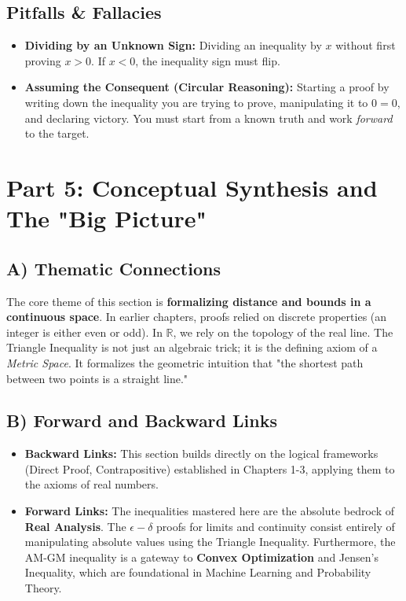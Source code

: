 \documentclass[11pt]{article}
\newcommand{\R}{\mathbb{R}}
\begin{document}
\subsection{Pitfalls \& Fallacies}
\begin{itemize}
    \item \textbf{Dividing by an Unknown Sign:} Dividing an inequality by $x$ without first proving $x > 0$. If $x < 0$, the inequality sign must flip.
    \item \textbf{Assuming the Consequent (Circular Reasoning):} Starting a proof by writing down the inequality you are trying to prove, manipulating it to $0 = 0$, and declaring victory. You must start from a known truth and work \textit{forward} to the target.
\end{itemize}

\newpage
\section{Part 5: Conceptual Synthesis and The "Big Picture"}

\subsection{A) Thematic Connections}
The core theme of this section is \textbf{formalizing distance and bounds in a continuous space}. In earlier chapters, proofs relied on discrete properties (an integer is either even or odd). In $\R$, we rely on the topology of the real line. The Triangle Inequality is not just an algebraic trick; it is the defining axiom of a \textit{Metric Space}. It formalizes the geometric intuition that "the shortest path between two points is a straight line."

\subsection{B) Forward and Backward Links}
\begin{itemize}
    \item \textbf{Backward Links:} This section builds directly on the logical frameworks (Direct Proof, Contrapositive) established in Chapters 1-3, applying them to the axioms of real numbers.
    \item \textbf{Forward Links:} The inequalities mastered here are the absolute bedrock of \textbf{Real Analysis}. The $\epsilon-\delta$ proofs for limits and continuity consist entirely of manipulating absolute values using the Triangle Inequality. Furthermore, the AM-GM inequality is a gateway to \textbf{Convex Optimization} and Jensen's Inequality, which are foundational in Machine Learning and Probability Theory.
\end{itemize}
\end{document}
